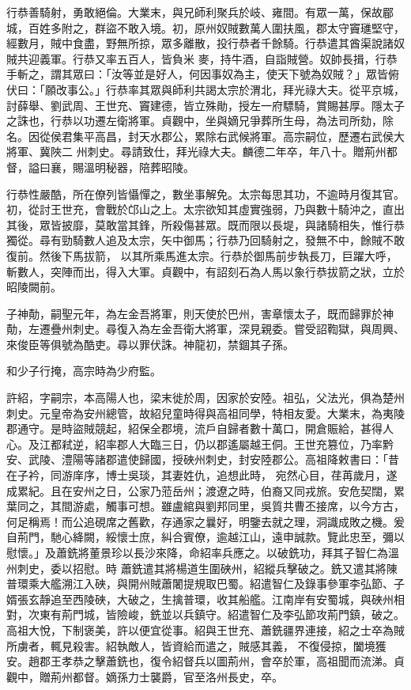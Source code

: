 \begin{pinyinscope}
 行恭善騎射，勇敢絕倫。大業末，與兄師利聚兵於岐、雍間。有眾一萬，保故郿城，百姓多附之，群盜不敢入境。初，原州奴賊數萬人圍扶風，郡太守竇璡堅守，經數月，賊中食盡，野無所掠，眾多離散，投行恭者千餘騎。行恭遣其酋渠說諸奴賊共迎義軍。行恭又率五百人，皆負米
 麥，持牛酒，自詣賊營。奴帥長揖，行恭手斬之，謂其眾曰：「汝等並是好人，何因事奴為主，使天下號為奴賊？」眾皆俯伏曰：「願改事公。」行恭率其眾與師利共謁太宗於渭北，拜光祿大夫。從平京城，討薛舉、劉武周、王世充、竇建德，皆立殊勛，授左一府驃騎，賞賜甚厚。隱太子之誅也，行恭以功遷左衛將軍。貞觀中，坐與嫡兄爭葬所生母，為法司所劾，除名。因從侯君集平高昌，封天水郡公，累除右武候將軍。高宗嗣位，歷遷右武侯大將軍、冀陜二
 州刺史。尋請致仕，拜光祿大夫。麟德二年卒，年八十。贈荊州都督，謚曰襄，賜溫明秘器，陪葬昭陵。



 行恭性嚴酷，所在僚列皆懾憚之，數坐事解免。太宗每思其功，不逾時月復其官。初，從討王世充，會戰於邙山之上。太宗欲知其虛實強弱，乃與數十騎沖之，直出其後，眾皆披靡，莫敢當其鋒，所殺傷甚眾。既而限以長堤，與諸騎相失，惟行恭獨從。尋有勁騎數人追及太宗，矢中御馬；行恭乃回騎射之，發無不中，餘賊不敢復前。然後下馬拔箭，
 以其所乘馬進太宗。行恭於御馬前步執長刀，巨躍大呼，斬數人，突陣而出，得入大軍。貞觀中，有詔刻石為人馬以象行恭拔箭之狀，立於昭陵闕前。



 子神勣，嗣聖元年，為左金吾將軍，則天使於巴州，害章懷太子，既而歸罪於神勣，左遷疊州刺史。尋復入為左金吾衛大將軍，深見親委。嘗受詔鞫獄，與周興、來俊臣等俱號為酷吏。尋以罪伏誅。神龍初，禁錮其子孫。



 和少子行掩，高宗時為少府監。



 許紹，字嗣宗，本高陽人也，梁末徙於周，因家於安陸。祖弘，父法光，俱為楚州刺史。元皇帝為安州總管，故紹兒童時得與高祖同學，特相友愛。大業末，為夷陵郡通守。是時盜賊競起，紹保全郡境，流戶自歸者數十萬口，開倉賑給，甚得人心。及江都弒逆，紹率郡人大臨三日，仍以郡遙屬越王侗。王世充篡位，乃率黔安、武陵、澧陽等諸郡遣使歸國，授硤州刺史，封安陸郡公。高祖降敕書曰：「昔在子衿，同游庠序，博士吳琰，其妻姓仇，追想此時，
 宛然心目，荏苒歲月，遂成累紀。且在安州之日，公家乃蒞岳州；渡遼之時，伯裔又同戎旅。安危契闊，累葉同之，其間游處，觸事可想。雖盧綰與劉邦同里，吳質共曹丕接席，以今方古，何足稱焉！而公追硯席之舊歡，存通家之曩好，明鑒去就之理，洞識成敗之機。爰自荊門，馳心絳闕，綏懷士庶，糾合賓僚，逾越江山，遠申誠款。覽此忠至，彌以慰懷。」及蕭銑將董景珍以長沙來降，命紹率兵應之。以破銑功，拜其子智仁為溫州刺史，委以招慰。時
 蕭銑遣其將楊道生圍硤州，紹縱兵擊破之。銑又遣其將陳普環乘大艦溯江入硤，與開州賊蕭闍提規取巴蜀。紹遣智仁及錄事參軍李弘節、子婿張玄靜追至西陵硤，大破之，生擒普環，收其船艦。江南岸有安蜀城，與硤州相對，次東有荊門城，皆險峻，銑並以兵鎮守。紹遣智仁及李弘節攻荊門鎮，破之。高祖大悅，下制褒美，許以便宜從事。紹與王世充、蕭銑疆界連接，紹之士卒為賊所虜者，輒見殺害。紹執敵人，皆資給而遣之，賊感其義，
 不復侵掠，闔境獲安。趙郡王孝恭之擊蕭銑也，復令紹督兵以圖荊州，會卒於軍，高祖聞而流涕。貞觀中，贈荊州都督。嫡孫力士襲爵，官至洛州長史，卒。




\end{pinyinscope}
